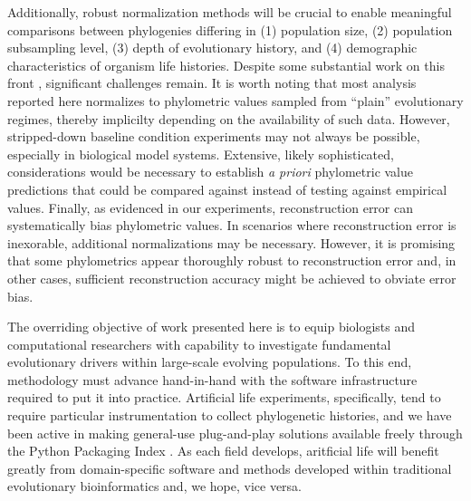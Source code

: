 Additionally, robust normalization methods will be crucial to enable meaningful comparisons between phylogenies differing in (1) population size, (2) population subsampling level, (3) depth of evolutionary history, and (4) demographic characteristics of organism life histories.
Despite some substantial work on this front \citep{shao1990tree,mir2018sound}, significant challenges remain.
It is worth noting that most analysis reported here normalizes to phylometric values sampled from ``plain'' evolutionary regimes, thereby implicilty depending on the availability of such data.
However, stripped-down baseline condition experiments may not always be possible, especially in biological model systems.
Extensive, likely sophisticated, considerations would be necessary to establish \textit{a priori} phylometric value predictions that could be compared against instead of testing against empirical values.
Finally, as evidenced in our experiments, reconstruction error can systematically bias phylometric values.
In scenarios where reconstruction error is inexorable, additional normalizations may be necessary.
However, it is promising that some phylometrics appear thoroughly robust to reconstruction error and, in other cases, sufficient reconstruction accuracy might be achieved to obviate error bias.

The overriding objective of work presented here is to equip biologists and computational researchers with capability to investigate fundamental evolutionary drivers within large-scale evolving populations.
To this end, methodology must advance hand-in-hand with the software infrastructure required to put it into practice.
Artificial life experiments, specifically, tend to require particular instrumentation to collect phylogenetic histories, and we have been active in making general-use plug-and-play solutions available freely through the Python Packaging Index \citep{moreno2022hstrat,dolson2024phylotrackpy}.
As each field develops, aritficial life will benefit greatly from domain-specific software and methods developed within traditional evolutionary bioinformatics and, we hope, vice versa.



